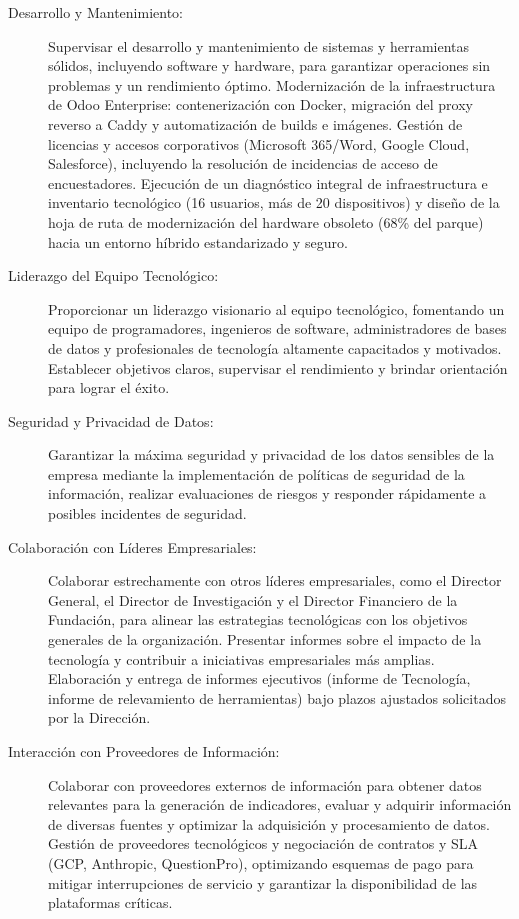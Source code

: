 {\begin{description}
		\item[Desarrollo y Mantenimiento:] Supervisar el desarrollo y mantenimiento de sistemas y herramientas sólidos, incluyendo software y hardware, para garantizar operaciones sin problemas y un rendimiento óptimo. Modernización de la infraestructura de Odoo Enterprise: contenerización con Docker, migración del proxy reverso a Caddy y automatización de builds e imágenes. Gestión de licencias y accesos corporativos (Microsoft 365/Word, Google Cloud, Salesforce), incluyendo la resolución de incidencias de acceso de encuestadores. Ejecución de un diagnóstico integral de infraestructura e inventario tecnológico (16 usuarios, más de 20 dispositivos) y diseño de la hoja de ruta de modernización del hardware obsoleto (68\% del parque) hacia un entorno híbrido estandarizado y seguro.
		\item[Liderazgo del Equipo Tecnológico:] Proporcionar un liderazgo visionario al equipo tecnológico, fomentando un equipo de programadores, ingenieros de software, administradores de bases de datos y profesionales de tecnología altamente capacitados y motivados. Establecer objetivos claros, supervisar el rendimiento y brindar orientación para lograr el éxito.
		\item[Seguridad y Privacidad de Datos:] Garantizar la máxima seguridad y privacidad de los datos sensibles de la empresa mediante la implementación de políticas de seguridad de la información, realizar evaluaciones de riesgos y responder rápidamente a posibles incidentes de seguridad.
		\item[Colaboración con Líderes Empresariales:] Colaborar estrechamente con otros líderes empresariales, como el Director General, el Director de Investigación y el Director Financiero de la Fundación, para alinear las estrategias tecnológicas con los objetivos generales de la organización. Presentar informes sobre el impacto de la tecnología y contribuir a iniciativas empresariales más amplias. Elaboración y entrega de informes ejecutivos (informe de Tecnología, informe de relevamiento de herramientas) bajo plazos ajustados solicitados por la Dirección.
		\item[Interacción con Proveedores de Información:] Colaborar con proveedores externos de información para obtener datos relevantes para la generación de indicadores, evaluar y adquirir información de diversas fuentes y optimizar la adquisición y procesamiento de datos. Gestión de proveedores tecnológicos y negociación de contratos y SLA (GCP, Anthropic, QuestionPro), optimizando esquemas de pago para mitigar interrupciones de servicio y garantizar la disponibilidad de las plataformas críticas.

\end{description}}
